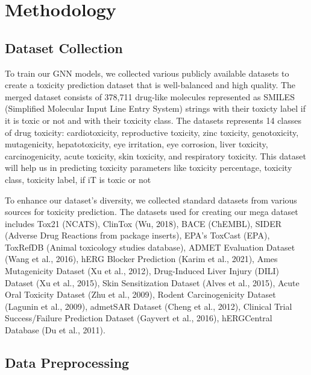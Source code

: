 \documentclass[conference]{IEEEtran}
\begin{document}
\section{Methodology}

\subsection{Dataset Collection}
To train our GNN models, we collected various publicly available datasets to create a toxicity prediction dataset that is well-balanced and high quality. The merged dataset consists of 378,711 drug-like molecules represented as SMILES (Simplified Molecular Input Line Entry System) strings with their toxicty label if it is toxic or not and with their toxicity class. The datasets represents 14 classes of drug toxicity: cardiotoxicity, reproductive toxicity, zinc toxicity, genotoxicity, mutagenicity, hepatotoxicity, eye irritation, eye corrosion, liver toxicity, carcinogenicity, acute toxicity, skin toxicity, and respiratory toxicity. This dataset will help us in predicting toxicity parameters like toxicity percentage, toxicity class, toxicity label, if iT is toxic or not

\vspace{0.5cm}

To enhance our dataset's diversity, we collected standard datasets from various sources for toxicity prediction. The datasets used for creating our mega dataset includes Tox21 (NCATS), ClinTox (Wu, 2018), BACE (ChEMBL), SIDER (Adverse Drug Reactions from package inserts), EPA's ToxCast (EPA), ToxRefDB (Animal toxicology studies database), ADMET Evaluation Dataset (Wang et al., 2016), hERG Blocker Prediction (Karim et al., 2021), Ames Mutagenicity Dataset (Xu et al., 2012), Drug-Induced Liver Injury (DILI) Dataset (Xu et al., 2015), Skin Sensitization Dataset (Alves et al., 2015), Acute Oral Toxicity Dataset (Zhu et al., 2009), Rodent Carcinogenicity Dataset (Lagunin et al., 2009), admetSAR Dataset (Cheng et al., 2012), Clinical Trial Success/Failure Prediction Dataset (Gayvert et al., 2016), hERGCentral Database (Du et al., 2011).




\subsection{Data Preprocessing}
\end{document}
